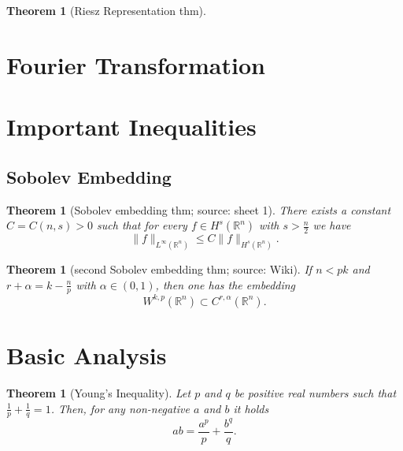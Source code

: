 \documentclass[12pt,a4paper]{article}
\newtheorem{thm}[definition]{Theorem}
\begin{document}
\begin{thm}[Riesz Representation thm]
\end{thm}

\section{Fourier Transformation}

\section{Important Inequalities}

\subsection{Sobolev Embedding}

\begin{thm}[Sobolev embedding thm; source: sheet 1]
There exists a constant $C=C(n,s)>0$ such that for every $f\in H^s(\mathbb{R}^n)$ with $s>\frac{n}{2}$ we have
\begin{equation}
\lVert f \rVert_{L^{\infty}(\mathbb{R}^n)} \leq C \lVert f \rVert _{H^s(\mathbb{R}^n)}.
\end{equation}
\end{thm}

\begin{thm}[second Sobolev embedding thm; source: Wiki]
If $n<pk$ and $r+\alpha=k-\frac{n}{p}$ with $\alpha \in (0,1)$, then one has the embedding
\begin{equation}
W^{k,p}(\mathbb{R}^n) \subset C^{r,\alpha}(\mathbb{R}^n).
\end{equation}
\end{thm}


\section{Basic Analysis}

\begin{thm}[Young's Inequality]
Let $p$ and $q$ be positive real numbers such that $\frac{1}{p} + \frac{1}{q} = 1$. Then, for any non-negative $a$ and $b$ it holds
\begin{equation}
ab=\frac{a^p}{p}+\frac{b^q}{q}.
\end{equation}
\end{thm}
\end{document}
